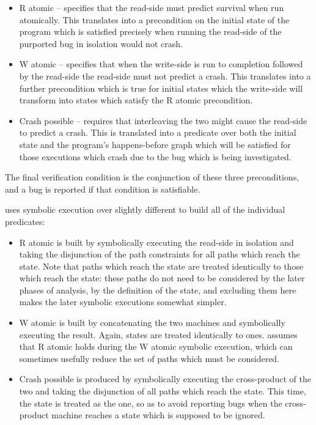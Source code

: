 \begin{itemize}
\item
  R atomic -- specifies that the read-side {\StateMachine} must
  predict survival when run atomically.  This translates into a
  precondition on the initial state of the program which is satisfied
  precisely when running the read-side of the purported bug in
  isolation would not crash.
\item
  W atomic -- specifies that when the write-side {\StateMachine} is
  run to completion followed by the read-side {\StateMachine} the
  read-side {\StateMachine} must not predict a crash.  This translates
  into a further precondition which is true for initial states which
  the write-side {\StateMachine} will transform into states which
  satisfy the R atomic precondition.
\item
  Crash possible -- requires that interleaving the two
  {\StateMachines} might cause the read-side {\StateMachine} to
  predict a crash.  This is translated into a predicate over both the
  initial state and the program's happens-before graph which will be
  satisfied for those executions which crash due to the bug which is
  being investigated.
\end{itemize}

  The final verification condition is the
conjunction of these three preconditions, and a bug is reported if
that condition is satisfiable.

{\Technique} uses symbolic execution over slightly different
{\StateMachines} to build all of the individual predicates:

\begin{itemize}
\item R atomic is built by symbolically executing the read-side
  {\StateMachine} in isolation and taking the disjunction of the path
  constraints for all paths which reach the  state.
  Note that paths which reach the  state are treated
  identically to those which reach the  state: these
  paths do not need to be considered by the later phases of analysis,
  by the definition of the  state, and excluding them
  here makes the later symbolic executions somewhat simpler.
\item W atomic is built by concatenating the two machines and
  symbolically executing the result.  Again,  states
  are treated identically to  ones.  {\Technique} assumes
  that R atomic holds during the W atomic symbolic execution, which
  can sometimes usefully reduce the set of paths which must be
  considered.
\item Crash possible is produced by symbolically executing the
  cross-product of the two {\StateMachines} and taking the disjunction
  of all paths which reach the  state.  This time, the
   state is treated as the  one,
  so as to avoid reporting bugs when the cross-product machine
  reaches a state which is supposed to be ignored.
\end{itemize}

